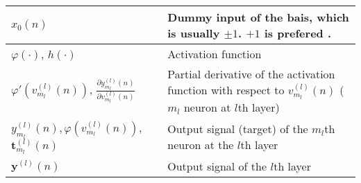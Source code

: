 \begin{xltabular}{\textwidth}{XX}
	\(x_0(n)\)                                                                                                                                                                     & Dummy input of the bais, which is usually \(\pm 1\). \(+1\) is prefered \cite{bishopPatternRecognitionMachine2006,haykinNeuralNetworksLearning2009}.                                                                                                                                                                                   \\ \hline
	\(\varphi(\cdot)\)\cite{haykinNeuralNetworksLearning2009}, \(h(\cdot)\)\cite{bishopPatternRecognitionMachine2006}                                                              & Activation function                                                                                                                                                                                                                                                                                                                    \\ \hline
	\(\varphi'(v_{m_l}^{(l)}(n))\)\cite{haykinNeuralNetworksLearning2009}, \(\frac{\partial y_{m_l}^{(l)}(n)}{\partial v_{m_l}^{(l)}(n)}\) \cite{haykinNeuralNetworksLearning2009} & Partial derivative of the activation function with respect to \(v_{m_l}^{(l)}(n)\) (\(m_l\) neuron at \(l\)th layer)                                                                                                                                                                                                                   \\ \hline
	\(y_{m_l}^{(l)}(n), \varphi \left( v_{m_l}^{(l)}(n) \right)\)\cite{haykinNeuralNetworksLearning2009}, \(\mathbf{t}_{m_l}^{(l)}(n)\)\cite{bishopPatternRecognitionMachine2006}  & Output signal (target) of the \(m_l\)th neuron at the \(l\)th layer                                                                                                                                                                                                                                                                    \\ \hline
	\(\mathbf{y}^{(l)}(n)\)                                                                                                                                                        & Output signal of the \(l\)th layer                                                                                                                                                                                                                                                                                                     \\ \hline

\end{xltabular}
